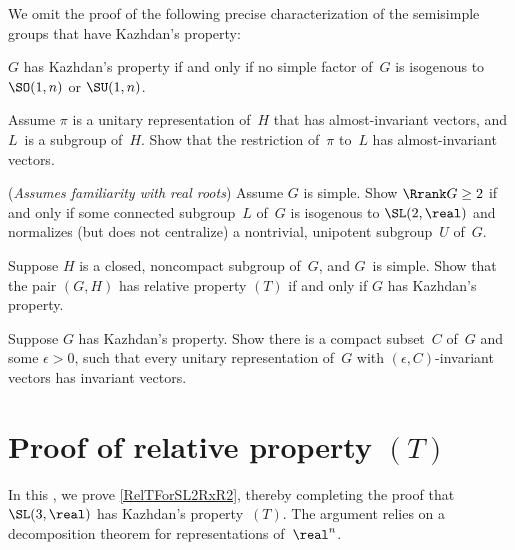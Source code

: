 We omit the proof of the following precise characterization of the semisimple groups that have Kazhdan's property:

\begin{thm} \label{WhichGKazhdan}
 $G$ has Kazhdan's property if and only if no simple
factor of~$G$ is isogenous to\/ $\SO(1,n)$ or\/ $\SU(1,n)$.
\end{thm}

\begin{exercises}

\item \label{RestrictAlmInvt}
Assume $\pi$ is a unitary representation of~$H$ that has almost-invariant vectors, and $L$~is a subgroup of~$H$. Show that the restriction of~$\pi$ to~$L$ has almost-invariant vectors. 

\item \label{SL2RxRnInG}
(\emph{Assumes familiarity with real roots})
Assume $G$ is simple. Show $\Rrank G \ge 2$ if and only if some connected subgroup~$L$ of~$G$ is isogenous to $\SL(2,\real)$ and normalizes (but does not centralize) a nontrivial, unipotent subgroup~$U$ of~$G$.

\item
Suppose $H$ is a closed, noncompact subgroup of~$G$, and $G$~is simple.
Show that the pair $(G,H)$ has relative property $(T)$ if and only if $G$ has Kazhdan's property.

\item Suppose $G$ has Kazhdan's property. Show there is a compact subset~$C$ of~$G$ and some $\epsilon > 0$, such that every unitary representation of~$G$ with $(\epsilon,C)$-invariant vectors has invariant vectors.

\end{exercises}




\section{Proof of relative property \texorpdfstring{$(T)$}{(T)}} \label{RelTForSL2RxR2Sect}

In this , we prove \cref{RelTForSL2RxR2}, thereby completing the proof that $\SL(3,\real)$ has Kazhdan's property~$(T)$. The argument relies on a decomposition theorem for representations of~$\real^n$.

